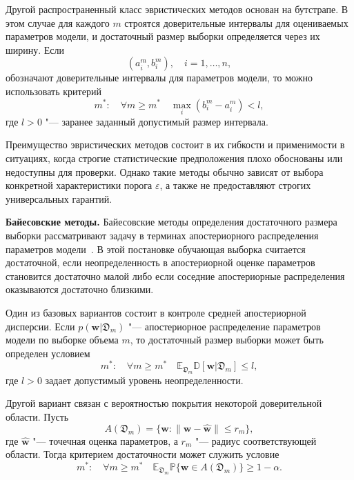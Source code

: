 Другой распространенный класс эвристических методов основан на бутстрапе. В этом случае для каждого $m$ строятся доверительные интервалы для оцениваемых параметров модели, и достаточный размер выборки определяется через их ширину. Если
\begin{equation}
    (a_i^m, b_i^m), \quad i=1, \dots, n,
\end{equation}
обозначают доверительные интервалы для параметров модели, то можно использовать критерий
\begin{equation}
    \label{eq:review-bootstrap}
    m^*:\quad
    \forall m\ge m^*
    \quad
    \max_i(b_i^m-a_i^m)<l,
\end{equation}
где $l>0$ "--- заранее заданный допустимый размер интервала.

Преимущество эвристических методов состоит в их гибкости и применимости в ситуациях, когда строгие статистические предположения плохо обоснованы или недоступны для проверки. Однако такие методы обычно зависят от выбора конкретной характеристики порога $\varepsilon$, а также не предоставляют строгих универсальных гарантий.

\textbf{Байесовские методы.} Байесовские методы определения достаточного размера выборки рассматривают задачу в терминах апостериорного распределения параметров модели~\cite{lindley1997,rubin1998,wang2002}. В этой постановке обучающая выборка считается достаточной, если неопределенность в апостериорной оценке параметров становится достаточно малой либо если соседние апостериорные распределения оказываются достаточно близкими.

Один из базовых вариантов состоит в контроле средней апостериорной дисперсии. Если $p(\mathbf w | \mathfrak D_m)$ "--- апостериорное распределение параметров модели по выборке объема $m$, то достаточный размер выборки может быть определен условием
\begin{equation}
    \label{eq:review-bayes-var}
    m^*:\quad
    \forall m\ge m^*
    \quad
    \mathbb E_{\mathfrak D_m}
    \mathbb{D}[\mathbf w | \mathfrak D_m]
    \le l,
\end{equation}
где $l>0$ задает допустимый уровень неопределенности.

Другой вариант связан с вероятностью покрытия некоторой доверительной области. Пусть
\begin{equation}
    A(\mathfrak D_m)
    =
    \{\mathbf w:\|\mathbf w-\hat{\mathbf w}\|\le r_m\},
\end{equation}
где $\hat{\mathbf w}$ "--- точечная оценка параметров, а $r_m$ "--- радиус соответствующей области. Тогда критерием достаточности может служить условие
\begin{equation}
    \label{eq:review-bayes-cover}
    m^*:\quad
    \forall m\ge m^*
    \quad
    \mathbb E_{\mathfrak D_m}
    \mathbb{P}\{\mathbf w\in A(\mathfrak D_m)\}
    \ge 1-\alpha.
\end{equation}

